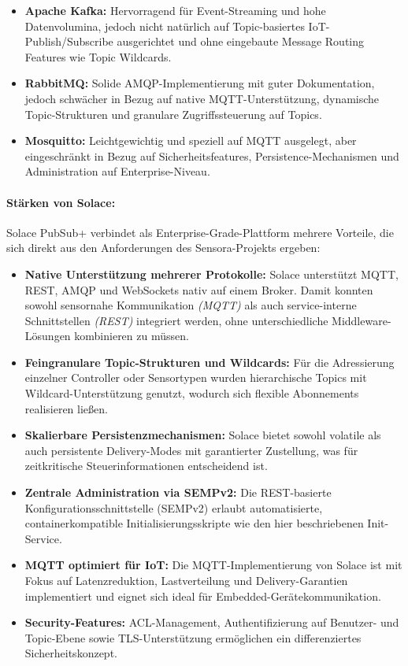 \begin{itemize}
  \item \textbf{Apache Kafka:} Hervorragend f\"ur Event-Streaming und hohe Datenvolumina, jedoch nicht nat\"urlich auf Topic-basiertes IoT-Publish/Subscribe ausgerichtet und ohne eingebaute Message Routing Features wie Topic Wildcards.\cite{mqtt_vs_kafka}
  \item \textbf{RabbitMQ:} Solide AMQP-Implementierung mit guter Dokumentation, jedoch schw\"acher in Bezug auf native MQTT-Unterst\"utzung, dynamische Topic-Strukturen und granulare Zugriffssteuerung auf Topics.
  \item \textbf{Mosquitto:} Leichtgewichtig und speziell auf MQTT ausgelegt, aber eingeschr\"ankt in Bezug auf Sicherheitsfeatures, Persistence-Mechanismen und Administration auf Enterprise-Niveau.
\end{itemize}

\paragraph*{St\"arken von Solace:}

Solace PubSub+ verbindet als Enterprise-Grade-Plattform mehrere Vorteile, die sich direkt aus den Anforderungen des Sensora-Projekts ergeben:

\begin{itemize}
  \item \textbf{Native Unterst\"utzung mehrerer Protokolle:} Solace unterst\"utzt MQTT, REST, AMQP und WebSockets nativ auf einem Broker. Damit konnten sowohl sensornahe Kommunikation \textit{(MQTT)} als auch service-interne Schnittstellen \textit{(REST)} integriert werden, ohne unterschiedliche Middleware-L\"osungen kombinieren zu m\"ussen.
  \item \textbf{Feingranulare Topic-Strukturen und Wildcards:} F\"ur die Adressierung einzelner Controller oder Sensortypen wurden hierarchische Topics mit Wildcard-Unterst\"utzung genutzt, wodurch sich flexible Abonnements realisieren lie\ss{}en.
  \item \textbf{Skalierbare Persistenzmechanismen:} Solace bietet sowohl volatile als auch persistente Delivery-Modes mit garantierter Zustellung, was f\"ur zeitkritische Steuerinformationen entscheidend ist.
  \item \textbf{Zentrale Administration via SEMPv2:} Die REST-basierte Konfigurationsschnittstelle (SEMPv2) erlaubt automatisierte, containerkompatible Initialisierungsskripte wie den hier beschriebenen Init-Service.
  \item \textbf{MQTT optimiert f\"ur IoT:} Die MQTT-Implementierung von Solace ist mit Fokus auf Latenzreduktion, Lastverteilung und Delivery-Garantien implementiert und eignet sich ideal f\"ur Embedded-Ger\"atekommunikation.
  \item \textbf{Security-Features:} ACL-Management, Authentifizierung auf Benutzer- und Topic-Ebene sowie TLS-Unterst\"utzung erm\"oglichen ein differenziertes Sicherheitskonzept.
\end{itemize}

